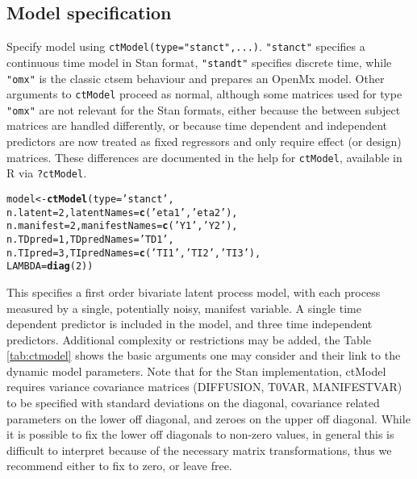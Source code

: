 \documentclass[11pt]{article}\usepackage[]{graphicx}\usepackage[]{color}
\makeatletter
\newcommand{\hlnum}[1]{\textcolor[rgb]{0.686,0.059,0.569}{#1}}%
\newcommand{\hlstr}[1]{\textcolor[rgb]{0.192,0.494,0.8}{#1}}%
\newcommand{\hlstd}[1]{\textcolor[rgb]{0.345,0.345,0.345}{#1}}%
\newcommand{\hlkwb}[1]{\textcolor[rgb]{0.69,0.353,0.396}{#1}}%
\newcommand{\hlkwc}[1]{\textcolor[rgb]{0.333,0.667,0.333}{#1}}%
\newcommand{\hlkwd}[1]{\textcolor[rgb]{0.737,0.353,0.396}{\textbf{#1}}}%
\newenvironment{kframe}{%
 \def\at@end@of@kframe{}%
 \ifinner\ifhmode%
  \def\at@end@of@kframe{\end{minipage}}%
  \begin{minipage}{\columnwidth}%
 \fi\fi%
 \def\FrameCommand##1{\hskip\@totalleftmargin \hskip-\fboxsep
 \colorbox{shadecolor}{##1}\hskip-\fboxsep
     \hskip-\linewidth \hskip-\@totalleftmargin \hskip\columnwidth}%
 \MakeFramed {\advance\hsize-\width
   \@totalleftmargin\z@ \linewidth\hsize
   \@setminipage}}%
 {\par\unskip\endMakeFramed%
 \at@end@of@kframe}
\newenvironment{knitrout}{}{} %
\makeatother
\begin{document}
\subsection{Model specification}
Specify model using \verb}ctModel(type="stanct",...)}. \verb|"stanct"| specifies a continuous time model in Stan format, \verb|"standt"| specifies discrete time, while \verb|"omx"| is the classic ctsem behaviour and prepares an OpenMx model. Other arguments to \verb|ctModel| proceed as normal, although some matrices used for type \verb|"omx"| are not relevant for the Stan formats, either because the between subject matrices are handled differently, or because time dependent and independent predictors are now treated as fixed regressors and only require effect (or design) matrices. These differences are documented in the help for \verb|ctModel|, available in R via \verb}?ctModel}.

\begin{knitrout}\small
{}\color{fgcolor}\begin{kframe}
\begin{alltt}
\hlstd{model}\hlkwb{<-}\hlkwd{ctModel}\hlstd{(}\hlkwc{type}\hlstd{=}\hlstr{'stanct'}\hlstd{,}
  \hlkwc{n.latent}\hlstd{=}\hlnum{2}\hlstd{,} \hlkwc{latentNames}\hlstd{=}\hlkwd{c}\hlstd{(}\hlstr{'eta1'}\hlstd{,}\hlstr{'eta2'}\hlstd{),}
  \hlkwc{n.manifest}\hlstd{=}\hlnum{2}\hlstd{,} \hlkwc{manifestNames}\hlstd{=}\hlkwd{c}\hlstd{(}\hlstr{'Y1'}\hlstd{,}\hlstr{'Y2'}\hlstd{),}
  \hlkwc{n.TDpred}\hlstd{=}\hlnum{1}\hlstd{,} \hlkwc{TDpredNames}\hlstd{=}\hlstr{'TD1'}\hlstd{,}
  \hlkwc{n.TIpred}\hlstd{=}\hlnum{3}\hlstd{,} \hlkwc{TIpredNames}\hlstd{=}\hlkwd{c}\hlstd{(}\hlstr{'TI1'}\hlstd{,}\hlstr{'TI2'}\hlstd{,}\hlstr{'TI3'}\hlstd{),}
  \hlkwc{LAMBDA}\hlstd{=}\hlkwd{diag}\hlstd{(}\hlnum{2}\hlstd{))}
\end{alltt}
\end{kframe}
\end{knitrout}

This specifies a first order bivariate latent process model, with each process measured by a single, potentially noisy, manifest variable. A single time dependent predictor is included in the model, and three time independent predictors. Additional complexity or restrictions may be added, the Table \ref{tab:ctmodel} shows the basic arguments one may consider and their link to the dynamic model parameters. Note that for the Stan implementation, ctModel requires variance covariance matrices (DIFFUSION, T0VAR, MANIFESTVAR) to be specified with standard deviations on the diagonal, covariance related parameters on the lower off diagonal, and zeroes on the upper off diagonal. While it is possible to fix the lower off diagonals to non-zero values, in general this is difficult to interpret because of the necessary matrix transformations, thus we recommend either to fix to zero, or leave free.
\end{document}
